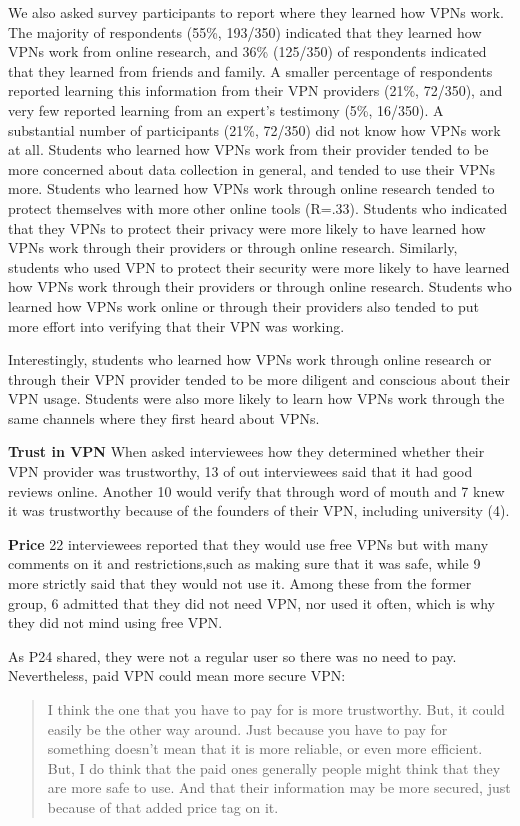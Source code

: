 We also asked survey participants to report where they learned how VPNs work.
The majority of respondents (55\%, 193/350) indicated that they learned how
VPNs work from online research, and 36\% (125/350) of respondents indicated
that they learned from friends and family. A smaller percentage of respondents
reported learning this information from their VPN providers (21\%, 72/350),
and very few reported learning from an expert’s testimony (5\%, 16/350). A
substantial number of participants (21\%, 72/350) did not know how VPNs work
at all.  Students who learned how VPNs work from their provider tended to be
more concerned about data collection in general, and tended to use their VPNs
more. Students who learned how VPNs work through online research tended to
protect themselves with more other online tools (R=.33). Students who
indicated that they VPNs to protect their privacy were more likely to have
learned how VPNs work through their providers or through online research.
Similarly, students who used VPN to protect their security were more likely to
have learned how VPNs work through their providers or through online research.
Students who learned how VPNs work online or through their providers also
tended to put more effort into verifying that their VPN was working.

Interestingly, students who learned how VPNs work through online research or
through their VPN provider tended to be more diligent and conscious about
their VPN usage. Students were also more likely to learn how VPNs work through
the same channels where they first heard about VPNs.

\textbf{Trust in VPN} When asked interviewees how they determined whether
their VPN provider was trustworthy, 13 of out interviewees said that it had
good reviews online. Another 10 would verify that through word of mouth and 7
knew it was trustworthy because of the founders of their VPN, including
university (4). 

\textbf{Price} 22 interviewees reported that they would use free VPNs but with
many comments on it and restrictions,such as making sure that it was safe,
while 9 more strictly said that they would not use it. Among these from the
former group, 6 admitted that they did not need VPN, nor used it often, which
is why they did not mind using free VPN. 

As P24 shared, they were not a regular user so there was no need to pay.
Nevertheless, paid VPN could mean more secure VPN: \begin{quote} I think the
one that you have to pay for is more trustworthy. But, it could easily be the
other way around. Just because you have to pay for something doesn't mean that
it is more reliable, or even more efficient. But, I do think that the paid
ones generally people might think that they are more safe to use. And that
their information may be more secured, just because of that added price tag on
it.\end{quote}

